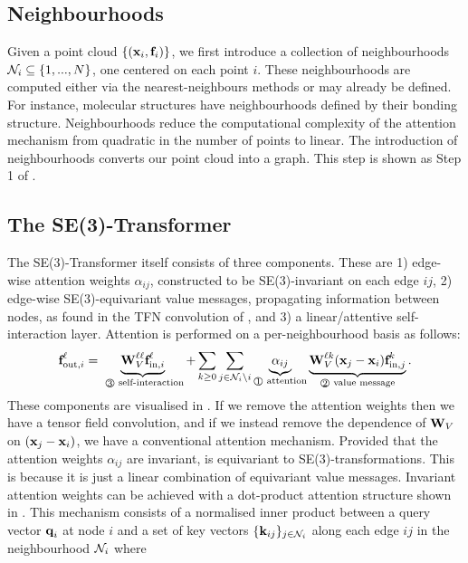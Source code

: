 \documentclass{article}
\begin{document}
\subsection{Neighbourhoods}
Given a point cloud $\{(\textbf{x}_i, \textbf{f}_i)\}$, we first introduce a collection of neighbourhoods $\mathcal{N}_i \subseteq \{1,...,N\}$, one centered on each point $i$. These neighbourhoods are computed either via the nearest-neighbours methods or may already be defined. For instance, molecular structures have neighbourhoods defined by their bonding structure. Neighbourhoods reduce the computational complexity of the attention mechanism from quadratic in the number of points to linear. The introduction of neighbourhoods converts our point cloud into a graph. This step is shown as Step 1 of .

\subsection{The SE(3)-Transformer}
\label{sec:method_attention}
The SE(3)-Transformer itself consists of three components. These are 1) edge-wise attention weights $\alpha_{ij}$, constructed to be SE(3)-invariant on each edge $ij$, 2) edge-wise SE(3)-equivariant value messages, propagating information between nodes, as found in the TFN convolution of , and 3) a linear/attentive self-interaction layer. Attention is performed on a per-neighbourhood basis as follows:
\begin{align}
\label{eq:att_equi}
    \bb{f}_{\text{out},i}^\ell = \underbrace{\bb{W}_V^{\ell \ell} \bb{f}_{\text{in},i}^{\ell}}_{\text{ \textcircled{\raisebox{-0.9pt}{3}} self-interaction}} + \sum_{k \geq 0} \sum_{j \in \mc{N}_i \setminus i} \underbrace{\alpha_{ij}}_{\text{\textcircled{\raisebox{-0.6pt}{1}} attention}} \underbrace{\bb{W}_V^{\ell k}(\bb{x}_j - \bb{x}_i) \bb{f}_{\text{in},j}^k}_{\text{\textcircled{\raisebox{-0.9pt}{2}} value message}}.
\end{align}
These components are visualised in . If we remove the attention weights then we have a tensor field convolution,
and if we instead remove the dependence of $\textbf{W}_V$ on $(\textbf{x}_j - \textbf{x}_i)$, we have a conventional attention mechanism.
Provided that the attention weights $\alpha_{ij}$ are invariant,  is equivariant to SE(3)-transformations. This is because it is just a linear combination of equivariant value messages. Invariant attention weights can be achieved with a dot-product attention structure shown in . This mechanism consists of a normalised inner product between a query vector $\textbf{q}_i$ at node $i$ and a set of key vectors $\{\textbf{k}_{ij}\}_{j \in \mathcal{N}_i}$ along each edge $ij$ in the neighbourhood $\mathcal{N}_i$ where
\end{document}
